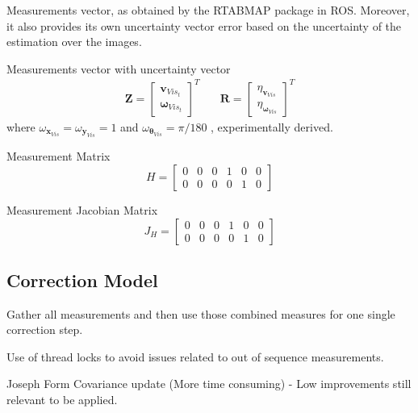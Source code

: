 Measurements vector, as obtained by the \gls{RTABMAP} package in \gls{ROS}.
Moreover, it also provides its own uncertainty vector error based on the uncertainty of the estimation over the images.

Measurements vector with uncertainty vector
\begin{align}
\mathbf{Z}
=
\begin{bmatrix}
\mathbf{v}_{Vis_t} \\
\boldsymbol \omega_{Vis_t}
\end{bmatrix}^T
& \quad
\mathbf{R}
=
\begin{bmatrix}
\eta_{\mathbf{v}_{Vis}} \\
\eta_{\boldsymbol \omega_{Vis}}
\end{bmatrix}^T
\end{align}
where $ \omega_{\mathbf{x}_{Vis}} = \omega_{\mathbf{y}_{Vis}} = 1$ and
$ \omega_{\boldsymbol \theta_{Vis}} = \pi/180 $ , experimentally derived.


Measurement Matrix
\begin{equation}
H
=
\begin{bmatrix}
0 & 0 & 0 & 1 & 0 & 0 \\
0 & 0 & 0 & 0 & 1 & 0
\end{bmatrix}
\end{equation}

Measurement Jacobian Matrix
\begin{equation}
J_H
=
\begin{bmatrix}
0 & 0 & 0 & 1 & 0 & 0 \\
0 & 0 & 0 & 0 & 1 & 0
\end{bmatrix}
\end{equation}



\subsection{Correction Model}

\noindent
Gather all measurements and then use those combined measures for one single correction step.


Use of thread locks to avoid issues related to out of sequence measurements.

Joseph Form Covariance update
(More time consuming) - Low improvements still relevant to be applied.



